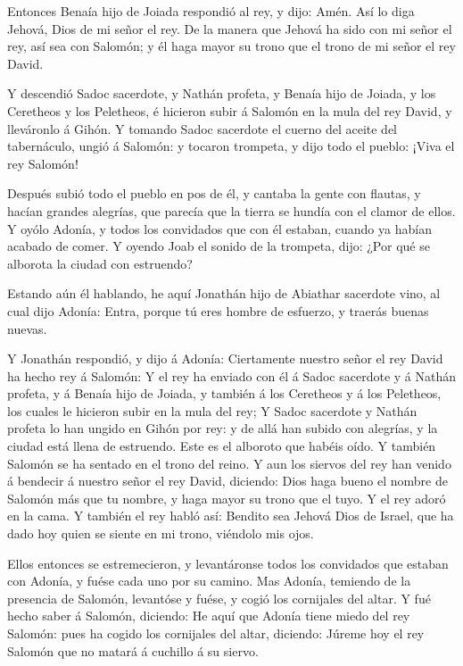  Entonces Benaía hijo de Joiada respondió al rey, y dijo:
Amén. Así lo diga Jehová, Dios de mi señor el rey.  De la
manera que Jehová ha sido con mi señor el rey, así sea con Salomón; y él
haga mayor su trono que el trono de mi señor el rey David.

 Y descendió Sadoc sacerdote, y Nathán profeta, y Benaía
hijo de Joiada, y los Ceretheos y los Peletheos, é hicieron subir á
Salomón en la mula del rey David, y lleváronlo á Gihón.  Y
tomando Sadoc sacerdote el cuerno del aceite del tabernáculo, ungió á
Salomón: y tocaron trompeta, y dijo todo el pueblo: ¡Viva el rey
Salomón!

 Después subió todo el pueblo en pos de él, y cantaba la
gente con flautas, y hacían grandes alegrías, que parecía que la tierra
se hundía con el clamor de ellos.  Y oyólo Adonía, y todos
los convidados que con él estaban, cuando ya habían acabado de comer. Y
oyendo Joab el sonido de la trompeta, dijo: ¿Por qué se alborota la
ciudad con estruendo?

 Estando aún él hablando, he aquí Jonathán hijo de Abiathar
sacerdote vino, al cual dijo Adonía: Entra, porque tú eres hombre de
esfuerzo, y traerás buenas nuevas.

 Y Jonathán respondió, y dijo á Adonía: Ciertamente nuestro
señor el rey David ha hecho rey á Salomón:  Y el rey ha
enviado con él á Sadoc sacerdote y á Nathán profeta, y á Benaía hijo de
Joiada, y también á los Ceretheos y á los Peletheos, los cuales le
hicieron subir en la mula del rey;  Y Sadoc sacerdote y
Nathán profeta lo han ungido en Gihón por rey: y de allá han subido con
alegrías, y la ciudad está llena de estruendo. Este es el alboroto que
habéis oído.  Y también Salomón se ha sentado en el trono
del reino.  Y aun los siervos del rey han venido á bendecir
á nuestro señor el rey David, diciendo: Dios haga bueno el nombre de
Salomón más que tu nombre, y haga mayor su trono que el tuyo. Y el rey
adoró en la cama.  Y también el rey habló así: Bendito sea
Jehová Dios de Israel, que ha dado hoy quien se siente en mi trono,
viéndolo mis ojos.

 Ellos entonces se estremecieron, y levantáronse todos los
convidados que estaban con Adonía, y fuése cada uno por su camino.
 Mas Adonía, temiendo de la presencia de Salomón, levantóse
y fuése, y cogió los cornijales del altar.  Y fué hecho
saber á Salomón, diciendo: He aquí que Adonía tiene miedo del rey
Salomón: pues ha cogido los cornijales del altar, diciendo: Júreme hoy
el rey Salomón que no matará á cuchillo á su siervo.

